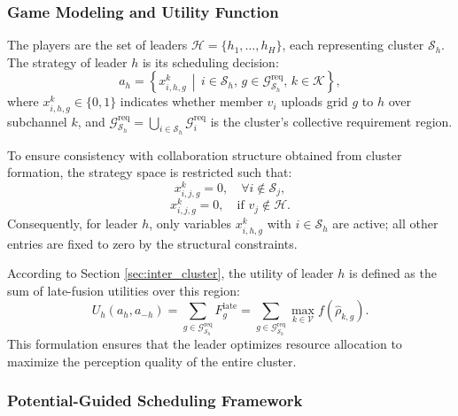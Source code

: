 \documentclass[conference]{IEEEtran}
\begin{document}
\subsubsection{Game Modeling and Utility Function}

The players are the set of leaders $\mathcal{H} = \{h_1, \dots, h_H\}$, each representing cluster $\mathcal{S}_h$. The strategy of leader $h$ is its scheduling decision:
\begin{equation}
a_h = \left\{ x_{i,h,g}^{k} \,\middle|\, i \in \mathcal{S}_h,\, g \in \mathcal{G}_{\mathcal{S}_h}^{\mathrm{req}},\, k \in \mathcal{K} \right\},
\end{equation}
where $x_{i,h,g}^{k} \in \{0,1\}$ indicates whether member $v_i$ uploads grid $g$ to $h$ over subchannel $k$, and $\mathcal{G}_{\mathcal{S}_h}^{\mathrm{req}} = \bigcup_{i \in \mathcal{S}_h} \mathcal{G}_i^{\mathrm{req}}$ is the cluster’s collective requirement region.

To ensure consistency with collaboration structure obtained from cluster formation, the strategy space is restricted such that:
\begin{equation}
x_{i,j,g}^{k} = 0, \quad \forall i \notin \mathcal{S}_j,
\label{eq:cluster_constraint}
\end{equation}
\begin{equation}
x_{i,j,g}^{k} = 0, \quad \text{if } v_j \notin \mathcal{H}.
\label{eq:leader_constraint}
\end{equation}
Consequently, for leader $h$, only variables $x_{i,h,g}^{k}$ with $i \in \mathcal{S}_h$ are active; all other entries are fixed to zero by the structural constraints.

According to Section \ref{sec:inter_cluster}, the utility of leader $h$ is defined as the sum of late-fusion utilities over this region:
\begin{equation}
U_h(a_h, a_{-h}) = \sum_{g \in \mathcal{G}_{\mathcal{S}_h}^{\mathrm{req}}} F_g^{\mathrm{late}} = \sum_{g \in \mathcal{G}_{\mathcal{S}_h}^{\mathrm{req}}} \max_{k \in \mathcal{V}}f(\hat{\rho}_{k,g}).
\label{eq:U_total_all}
\end{equation}
This formulation ensures that the leader optimizes resource allocation to maximize the perception quality of the entire cluster.

\subsubsection{Potential-Guided Scheduling Framework}
\end{document}
